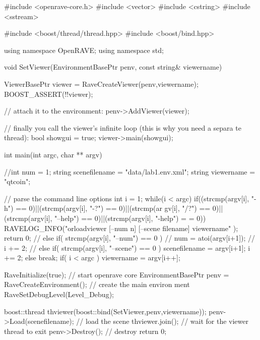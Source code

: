\begin{DoxyCodeInclude}

#include <openrave-core.h>
#include <vector>
#include <cstring>
#include <sstream>

#include <boost/thread/thread.hpp>
#include <boost/bind.hpp>

using namespace OpenRAVE;
using namespace std;

void SetViewer(EnvironmentBasePtr penv, const string& viewername)
{
    ViewerBasePtr viewer = RaveCreateViewer(penv,viewername);
    BOOST_ASSERT(!!viewer);

    // attach it to the environment:
    penv->AddViewer(viewer);

    // finally you call the viewer's infinite loop (this is why you need a separa
      te thread):
    bool showgui = true;
    viewer->main(showgui);

}

int main(int argc, char ** argv)
{
    //int num = 1;
    string scenefilename = "data/lab1.env.xml";
    string viewername = "qtcoin";

    // parse the command line options
    int i = 1;
    while(i < argc) {
        if((strcmp(argv[i], "-h") == 0)||(strcmp(argv[i], "-?") == 0)||(strcmp(ar
      gv[i], "/?") == 0)||(strcmp(argv[i], "--help") == 0)||(strcmp(argv[i], "-help") =
      = 0)) {
            RAVELOG_INFO("orloadviewer [--num n] [--scene filename] viewername\n"
      );
            return 0;
        }
        //        else if( strcmp(argv[i], "--num") == 0 ) {
        //            num = atoi(argv[i+1]);
        //            i += 2;
        //        }
        else if( strcmp(argv[i], "--scene") == 0 ) {
            scenefilename = argv[i+1];
            i += 2;
        }
        else
            break;
    }
    if( i < argc ) {
        viewername = argv[i++];
    }

    RaveInitialize(true); // start openrave core
    EnvironmentBasePtr penv = RaveCreateEnvironment(); // create the main environ
      ment
    RaveSetDebugLevel(Level_Debug);

    boost::thread thviewer(boost::bind(SetViewer,penv,viewername));
    penv->Load(scenefilename); // load the scene
    thviewer.join(); // wait for the viewer thread to exit
    penv->Destroy(); // destroy
    return 0;
}
\end{DoxyCodeInclude}
 
